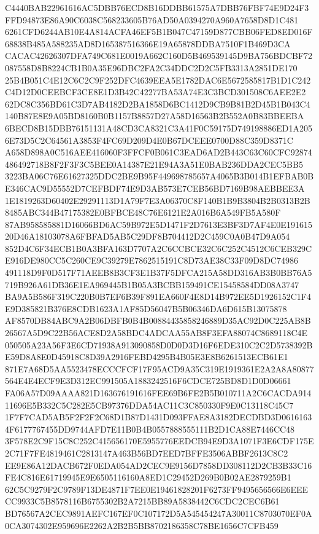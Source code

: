 \documentclass[UTF8,fontset=fandol,zihao=-4,a4paper]{ctexart}
\begin{document}
{{C4440BAB22961616AC5DBB76ECD8B16DDBB61575A7DBB76FBF74E9D24F3FFD94873E86A90C6038C568233605B76AD50A0394270A960A7658D8D1C481
6261CFD6244AB10E4A814ACFA46EF5B1B047C47159D877CBB06FED8ED016F68838B485A588235AD8D165387516366E19A65878DDBA7510F1B469D3CA
CACAC42626307DFA749C681E0019A662C160D5B469539145D9BA756BDCBF72087558D8B8224CB1B0A35E96DBC2FA2C34DDC2D2C5FB3313A2851DE170
25B4B051C4E12C6C2C9F252DFC4639EEA5E1782DAC6E5672585817B1D1C242C4D12D0CEEBCF3CE8E1D3B42C42277BA53A74E3C3BCD301508C6AEE2E2
62DC8C356BD61C3D7AB4182D2BA1858D6BC1412D9CB9B81B2D45B1B043C4140B87E8E9A05BD8160B0B1157B8857D27A58D16563B2B552A0B83BBEEBA
6BECD8B15DBB76151131A48CD3CA8321C3A41F0C59175D749198886ED1A2056E73D5C2C64561A3853F4FC69D209D4E0B67DCEEE0700D88C359D8371C
A658D898A0C516AEE416060F3FFCF0B061C3EAD6AD2B443C63C60CFC92874486492718B8F2F3F3C5BEE0A14387E21E94A3A51E0BAB236DDA2CEC5BB5
3223BA06C76E61627325DDC2BE9B95F449698785657A4065B3B014B1EFBAB0BE346CAC9D55552D7CEFBDF74E9D3AB573E7CEB56BD7169B98AEBBEE3A
1E1819263D60402E29291113D1A79F7E3A06370C8F140B1B9B3804B2B0313B2B8485ABC344B47175382E0BFBCE48C76E6121E2A016B6A549FB5A580F
87AB958585881D16066BD6AC59B972E5D1471F2D7613E3BF3D7AF4E0E19161520D46A18103078A6FBFAD5AB5C29DF8B704412D2C459C0A0B47D9A054
852D4C6F34ECB1B0A3BFA163D7707A2C6CCBCE32C6C252C4512C6CEB329CE916DE980CC5C260CE9C39279E7862515191C8D73AE38C33F09D8DC74986
491118D9F0D517F71AEEB8B3CF3E1B37F5DFCA215A58DD316AB3B0BB76A5719B926A61DB36E1EA969445B1B05A3BCBB159491CE15458584DD08A3747
BA9A5B586F319C220B0B7EF6B39F891EA660F4E8D14B972EE5D1926152C1F4E9D385821B376E8CDB1623A1AF85D56047B5B06346DA6D615B13075878
AF8570DB84ABC9A2B06DBFB0B4B00884435858246889D35AC92D0C225AB8B26567A5D9C22B56ACE8D2A58BDC4ADCAA55AB8F3EFA88074C8689118C4E
050505A23A56F3E6CD71938A913090858D0D0D3D16F6EDE310C2C2D5738392BE59D8A8E0D45918C8D39A2916FEBD4295B4B05E3E8B6261513ECB61E1
871E7A68D5AA5523478ECCCFCF17F95ACD9A35C319E1919361E2A2A8A80877564E4E4ECF9E3D312EC991505A1883242516F6CDCE725BD8D1D0D06661
FA06A57D09AAAA821D163676191616FEE69B6FE2B5B010711A2C6CACDA91411696E5B332C5C282E5CB97376DDA54AC11C3C850330F9E0C13118C45C7
1F7F7CAD5AB5F2F2F2C68D1B87D1431D093FFAE8A3182DECDBD3D06161634F6177767455DD9744AFD7E11B0B4B0557888555111B2D1CA88E7446CC48
3F578E2C9F15C8C252C415656170E5955776EEDCB94E9D3A1071F3E6CDF175E2C71F7FE4819461C2813147A463B56BD7EED7BFFE3506ABBF2613C8C2
EE9E86A12DACB672F0EDA054AD2CEC9E9156D7858DD308112D2CB3B33C16FE4C816E61719945E9E6505116160A8ED1C29452D269B0B02AE2879259B1
62C5C9279F2C9789F13DE4871F7EE0E19461828201F6273FF9495656566E6EEECC9933C5B8578116B6755302B2A7215BB89A5838442C6CDC2CEC6B61
BD76567A2CEC9891AEFC167EF0C107172D5A545454247A30011C8703070EF0A0CA3074302E959696E2262A2B2B5BB8702186358C78BE1656C7CFB459
}}
\end{document}

